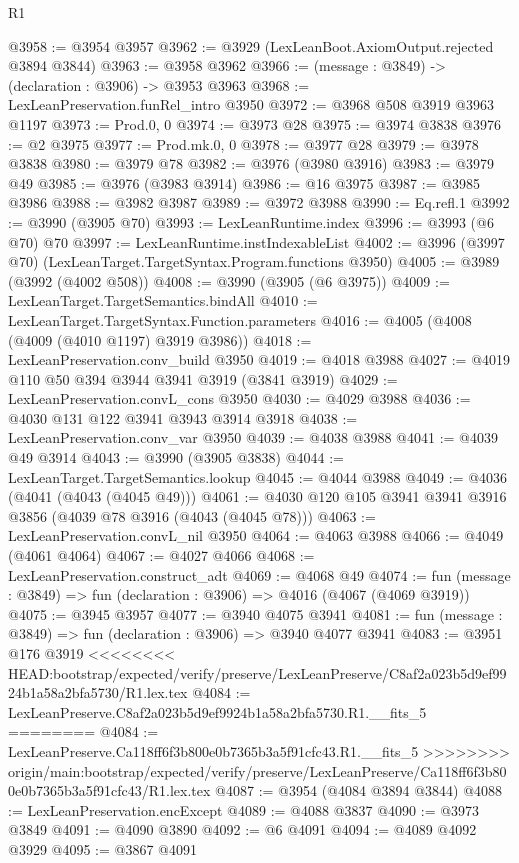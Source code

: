 \begin{lexlean}{R1}
\begin{coremodule}
{{{{{{{{{{{{{{{{{{{{{{{{{{{{{{{{{{{{{{{{{{{{{{{{{{{{{{{{{{{{{{{{{{{{{{{{{{{{{{{{{{{{{{{{{{{{{{{{{{{{{{{{{{{{{{{{{{{{{{{{{{{{{{{{{{{{{{{{{{{{{{{{{{{{{{{{{{{{{{{{{{{{{{{{{{{{{{{{{{{{{{{{{{@3958 := @3954 @3957
@3962 := @3929 (LexLeanBoot.AxiomOutput.rejected @3894 @3844)
@3963 := @3958 @3962
@3966 := (message : @3849) -> (declaration : @3906) -> @3953 @3963
@3968 := LexLeanPreservation.funRel_intro @3950
@3972 := @3968 @508 @3919 @3963 @1197
@3973 := Prod.{0, 0}
@3974 := @3973 @28
@3975 := @3974 @3838
@3976 := @2 @3975
@3977 := Prod.mk.{0, 0}
@3978 := @3977 @28
@3979 := @3978 @3838
@3980 := @3979 @78
@3982 := @3976 (@3980 @3916)
@3983 := @3979 @49
@3985 := @3976 (@3983 @3914)
@3986 := @16 @3975
@3987 := @3985 @3986
@3988 := @3982 @3987
@3989 := @3972 @3988
@3990 := Eq.refl.{1}
@3992 := @3990 (@3905 @70)
@3993 := LexLeanRuntime.index
@3996 := @3993 (@6 @70) @70
@3997 := LexLeanRuntime.instIndexableList
@4002 := @3996 (@3997 @70) (LexLeanTarget.TargetSyntax.Program.functions @3950)
@4005 := @3989 (@3992 (@4002 @508))
@4008 := @3990 (@3905 (@6 @3975))
@4009 := LexLeanTarget.TargetSemantics.bindAll
@4010 := LexLeanTarget.TargetSyntax.Function.parameters
@4016 := @4005 (@4008 (@4009 (@4010 @1197) @3919 @3986))
@4018 := LexLeanPreservation.conv_build @3950
@4019 := @4018 @3988
@4027 := @4019 @110 @50 @394 @3944 @3941 @3919 (@3841 @3919)
@4029 := LexLeanPreservation.convL_cons @3950
@4030 := @4029 @3988
@4036 := @4030 @131 @122 @3941 @3943 @3914 @3918
@4038 := LexLeanPreservation.conv_var @3950
@4039 := @4038 @3988
@4041 := @4039 @49 @3914
@4043 := @3990 (@3905 @3838)
@4044 := LexLeanTarget.TargetSemantics.lookup
@4045 := @4044 @3988
@4049 := @4036 (@4041 (@4043 (@4045 @49)))
@4061 := @4030 @120 @105 @3941 @3941 @3916 @3856 (@4039 @78 @3916 (@4043 (@4045 @78)))
@4063 := LexLeanPreservation.convL_nil @3950
@4064 := @4063 @3988
@4066 := @4049 (@4061 @4064)
@4067 := @4027 @4066
@4068 := LexLeanPreservation.construct_adt
@4069 := @4068 @49
@4074 := fun (message : @3849) => fun (declaration : @3906) => @4016 (@4067 (@4069 @3919))
@4075 := @3945 @3957
@4077 := @3940 @4075 @3941
@4081 := fun (message : @3849) => fun (declaration : @3906) => @3940 @4077 @3941
@4083 := @3951 @176 @3919
<<<<<<<< HEAD:bootstrap/expected/verify/preserve/LexLeanPreserve/C8af2a023b5d9ef9924b1a58a2bfa5730/R1.lex.tex
@4084 := LexLeanPreserve.C8af2a023b5d9ef9924b1a58a2bfa5730.R1.__fits_5
========
@4084 := LexLeanPreserve.Ca118ff6f3b800e0b7365b3a5f91cfc43.R1.__fits_5
>>>>>>>> origin/main:bootstrap/expected/verify/preserve/LexLeanPreserve/Ca118ff6f3b800e0b7365b3a5f91cfc43/R1.lex.tex
@4087 := @3954 (@4084 @3894 @3844)
@4088 := LexLeanPreservation.encExcept
@4089 := @4088 @3837
@4090 := @3973 @3849
@4091 := @4090 @3890
@4092 := @6 @4091
@4094 := @4089 @4092 @3929
@4095 := @3867 @4091
}}}}}}}}}}}}}}}}}}}}}}}}}}}}}}}}}}}}}}}}}}}}}}}}}}}}}}}}}}}}}}}}}}}}}}}}}}}}}}}}}}}}}}}}}}}}}}}}}}}}}}}}}}}}}}}}}}}}}}}}}}}}}}}}}}}}}}}}}}}}}}}}}}}}}}}}}}}}}}}}}}}}}}}}}}}}}}}}}}}}}}}}}}
\end{coremodule}
\end{lexlean}
